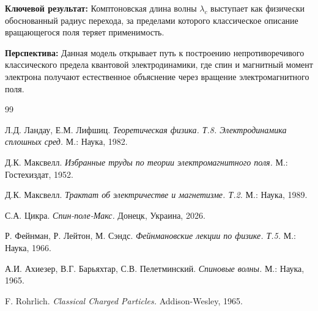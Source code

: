 \documentclass[12pt,a4paper]{article}
\begin{document}
\textbf{Ключевой результат:} Комптоновская длина волны $\lambda_c$ выступает как физически обоснованный радиус перехода, за пределами которого классическое описание вращающегося поля теряет применимость.

\textbf{Перспектива:} Данная модель открывает путь к построению непротиворечивого классического предела квантовой электродинамики, где спин и магнитный момент электрона получают естественное объяснение через вращение электромагнитного поля.

\begin{thebibliography}{99}

Л.Д. Ландау, Е.М. Лифшиц. \textit{Теоретическая физика. Т.8. Электродинамика сплошных сред.} М.: Наука, 1982.

Д.К. Максвелл. \textit{Избранные труды по теории электромагнитного поля.} М.: Гостехиздат, 1952.

Д.К. Максвелл. \textit{Трактат об электричестве и магнетизме. Т.2.} М.: Наука, 1989.

С.А. Цикра. \textit{Спин-поле-Макс.} Донецк, Украина, 2026.

Р. Фейнман, Р. Лейтон, М. Сэндс. \textit{Фейнмановские лекции по физике. Т.5.} М.: Наука, 1966.

А.И. Ахиезер, В.Г. Барьяхтар, С.В. Пелетминский. \textit{Спиновые волны.} М.: Наука, 1965.

F. Rohrlich. \textit{Classical Charged Particles.} Addison-Wesley, 1965.

\end{thebibliography}
\end{document}
